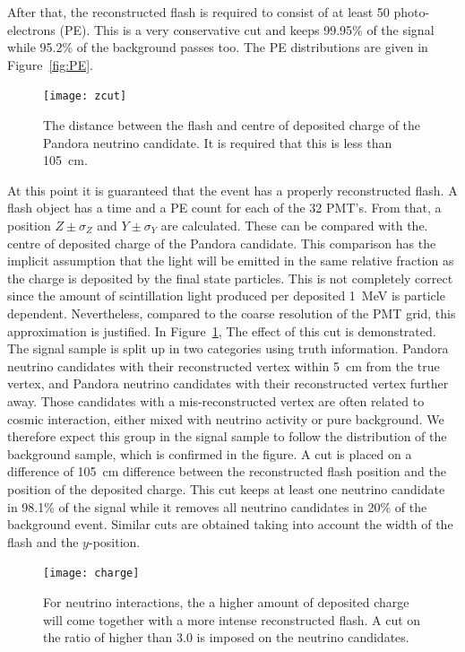 After that, the reconstructed flash is required to consist of at least 50 photo-electrons (PE). This is a very conservative cut and keeps 99.95\% of the signal while 95.2\% of the background passes too. The PE distributions are given in Figure~\ref{fig:PE}.

\begin{figure}[htbp]
\centering
\texttt{[image: zcut]}
\caption{The distance between the flash and centre of deposited charge of the Pandora neutrino candidate. It is required that this is less than \SI{105}{\cm}.} 
\label{fig:zcut}
\end{figure}

At this point it is guaranteed that the event has a properly reconstructed flash. A flash object has a time and a PE count for each of the 32 PMT's. From that, a position $Z\pm \sigma_Z$ and $Y\pm \sigma_Y$ are calculated. These can be compared with the. centre of deposited charge of the Pandora candidate. This comparison has the implicit assumption that the light will be emitted in the same relative fraction as the charge is deposited by the final state particles. This is not completely correct since the amount of scintillation light produced per deposited \SI{1}{\MeV} is particle dependent. Nevertheless, compared to the coarse resolution of the PMT grid, this approximation is justified. In Figure~\ref{fig:zcut}, The effect of this cut is demonstrated. The signal sample is split up in two categories using truth information. Pandora neutrino candidates with their reconstructed vertex within \SI{5}{\cm} from the true vertex, and Pandora neutrino candidates with their reconstructed vertex further away. Those candidates with a mis-reconstructed vertex are often related to cosmic interaction, either mixed with neutrino activity or pure background. We therefore expect this group in the signal sample to follow the distribution of the background sample, which is confirmed in the figure. A cut is placed on a difference of \SI{105}{\cm} difference between the reconstructed flash position and the position of the deposited charge. This cut keeps at least one neutrino candidate in 98.1\% of the signal while it removes all neutrino candidates in 20\% of the background event. 
Similar cuts are obtained taking into account the width of the flash and the $y$-position. 

\begin{figure}[!htbp]
\centering
\texttt{[image: charge]}
\caption{For neutrino interactions, the a higher amount of deposited charge will come together with a more intense reconstructed flash. A cut on the ratio of higher than 3.0 is imposed on the neutrino candidates.} 
\label{fig:charge}
\end{figure}

